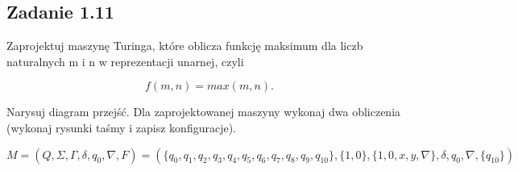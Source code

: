 \documentclass[leqno]{article}
\begin{document}
        \subsection{Zadanie 1.11}
            
            Zaprojektuj maszynę Turinga, które oblicza funkcję maksimum dla
            liczb naturalnych m i n w reprezentacji unarnej, czyli

            \begin{equation}
                f(m, n) = max(m, n).
            \end{equation}

            Narysuj diagram przejść. Dla zaprojektowanej maszyny wykonaj 
            dwa obliczenia (wykonaj rysunki taśmy i zapisz konfiguracje).
        
            \begin{equation}
                M = (Q, \Sigma, \Gamma, \delta, q_0, \nabla, F) = (
                    \{q_0, q_1, q_2, q_3, q_4, q_5, q_6, q_7, q_8, q_9, q_{10}\}, 
                    \{1, 0\}, 
                    \{1, 0, x, y, \nabla\}, 
                    \delta, 
                    q_0, 
                    \nabla, 
                    \{q_{10}\}
                )
            \end{equation}
\end{document}
